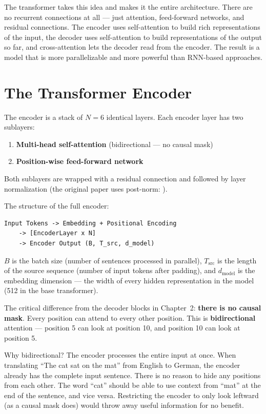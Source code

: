 The transformer takes this idea and makes it the entire architecture. There are no recurrent connections at all --- just attention, feed-forward networks, and residual connections. The encoder uses self-attention to build rich representations of the input, the decoder uses self-attention to build representations of the output so far, and cross-attention lets the decoder read from the encoder. The result is a model that is more parallelizable and more powerful than RNN-based approaches.

\section{The Transformer Encoder}

The encoder is a stack of $N = 6$ identical layers. Each encoder layer has two sublayers:

\begin{enumerate}
  \item \textbf{Multi-head self-attention} (bidirectional --- no causal mask)
  \item \textbf{Position-wise feed-forward network}
\end{enumerate}

Both sublayers are wrapped with a residual connection and followed by layer normalization (the original paper uses post-norm: ).

The structure of the full encoder:

\begin{verbatim}
Input Tokens -> Embedding + Positional Encoding
    -> [EncoderLayer x N]
    -> Encoder Output (B, T_src, d_model)
\end{verbatim}

$B$ is the batch size (number of sentences processed in parallel), $T_{\text{src}}$ is the length of the source sequence (number of input tokens after padding), and $d_{\text{model}}$ is the embedding dimension --- the width of every hidden representation in the model (512 in the base transformer).

The critical difference from the decoder blocks in Chapter~2: \textbf{there is no causal mask}. Every position can attend to every other position. This is \textbf{bidirectional} attention --- position 5 can look at position 10, and position 10 can look at position 5.

Why bidirectional? The encoder processes the entire input at once. When translating ``The cat sat on the mat'' from English to German, the encoder already has the complete input sentence. There is no reason to hide any positions from each other. The word ``cat'' should be able to use context from ``mat'' at the end of the sentence, and vice versa. Restricting the encoder to only look leftward (as a causal mask does) would throw away useful information for no benefit.

